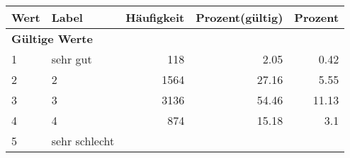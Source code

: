      \begin{longtable}{lXrrr}
     \toprule
     \textbf{Wert} & \textbf{Label} & \textbf{Häufigkeit} & \textbf{Prozent(gültig)} & \textbf{Prozent} \\
     \endhead
     \midrule
     \multicolumn{5}{l}{\textbf{Gültige Werte}}\\

     1 &
     \multicolumn{1}{X}{ sehr gut   } &


       \num{118} &
       \num[round-mode=places,round-precision=2]{2.05} &
         \num[round-mode=places,round-precision=2]{0.42} \\

     2 &
     \multicolumn{1}{X}{ 2   } &


       \num{1564} &
       \num[round-mode=places,round-precision=2]{27.16} &
         \num[round-mode=places,round-precision=2]{5.55} \\

     3 &
     \multicolumn{1}{X}{ 3   } &


       \num{3136} &
       \num[round-mode=places,round-precision=2]{54.46} &
         \num[round-mode=places,round-precision=2]{11.13} \\

     4 &
     \multicolumn{1}{X}{ 4   } &


       \num{874} &
       \num[round-mode=places,round-precision=2]{15.18} &
         \num[round-mode=places,round-precision=2]{3.1} \\

     5 &
     \multicolumn{1}{X}{ sehr schlecht   } &



\end{longtable}

